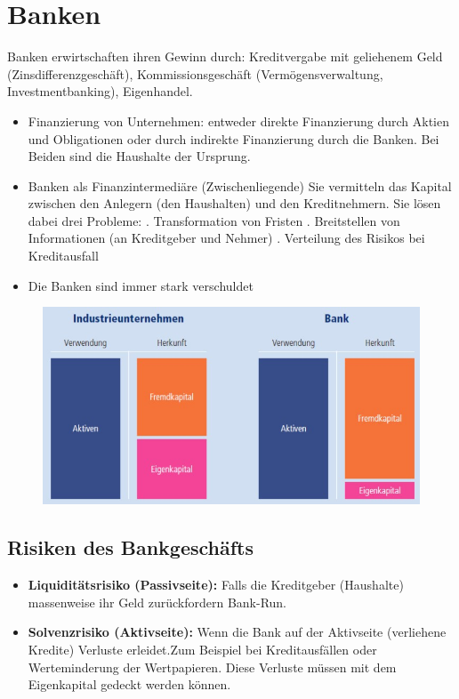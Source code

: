 \section{Banken}
Banken erwirtschaften ihren Gewinn durch: Kreditvergabe mit geliehenem Geld (Zinsdifferenzgeschäft), Kommissionsgeschäft (Vermögensverwaltung, Investmentbanking), Eigenhandel.
\begin{itemize}
	\item Finanzierung von Unternehmen: entweder direkte Finanzierung durch Aktien und Obligationen oder durch indirekte Finanzierung durch die Banken. Bei Beiden sind die Haushalte der Ursprung.
	\item Banken als Finanzintermediäre (Zwischenliegende)
	Sie vermitteln das Kapital zwischen den Anlegern (den Haushalten) und den Kreditnehmern. Sie lösen dabei drei Probleme: 
	. Transformation von Fristen
	. Breitstellen von Informationen (an Kreditgeber und Nehmer)
	. Verteilung des Risikos bei Kreditausfall
	\item Die Banken sind immer stark verschuldet 
\end{itemize}
\begin{figure}[h]
	\centering
	\includegraphics[width=0.7\linewidth]{images/banken.jpg}
\end{figure}
\subsection{Risiken des Bankgeschäfts}
\begin{itemize}
	\item \textbf{Liquiditätsrisiko (Passivseite):} Falls die Kreditgeber (Haushalte) massenweise ihr Geld zurückfordern Bank-Run.
	\item \textbf{Solvenzrisiko (Aktivseite):}  Wenn die Bank auf der Aktivseite (verliehene Kredite) Verluste erleidet.Zum Beispiel bei Kreditausfällen oder Werteminderung der Wertpapieren. Diese Verluste müssen mit dem Eigenkapital gedeckt werden können. 
\end{itemize}
